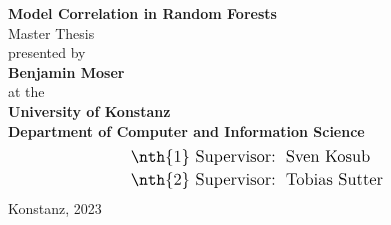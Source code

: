 \documentclass[
	twoside=false, %
]{kaobook}
\begin{document}
\begin{titlepage}
  \begin{center}
    {\LARGE \textbf{Model Correlation in Random Forests}}
    \\[2em]
    {\Large {Master Thesis}}
    \\[5.5em]
    {\Large presented by}
    \\[1.5em]
    {\Large \textbf{Benjamin Moser}}
    \\[1.5em]
    {\Large at the}
    \\[1.2em]
    {\Large \textbf{University of Konstanz}}
    \\[1.0em]
    {\Large \textbf{Department of Computer and Information Science}}
    \\[4em]
    \begin{align*}
      \text{\large {\nth{1} Supervisor}:~} &  \text{ \large Sven Kosub } \\
      \text{\large {\nth{2} Supervisor}:~} &  \text{ \large Tobias Sutter } \\
    \end{align*}
    \vfill
    {\Large {Konstanz, 2023}}
  \end{center}
\end{titlepage}

\end{document}
